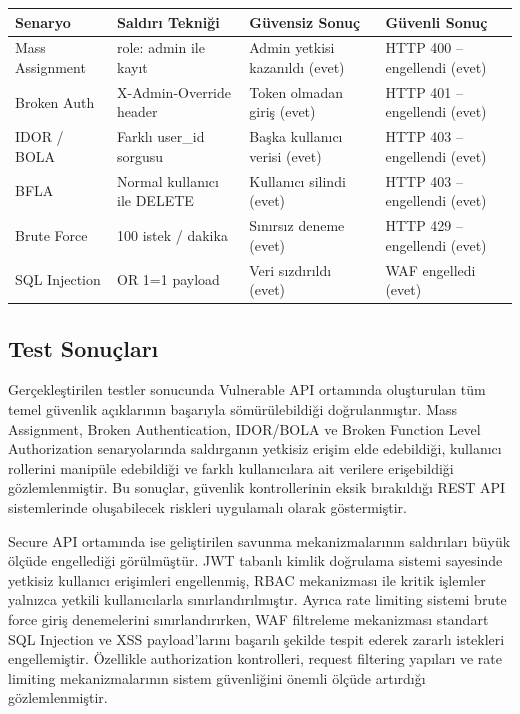 \begin{table}[H]
\centering
\begin{tabular}{|L{3.0cm}|L{3.0cm}|L{3.0cm}|L{3.0cm}|}
\hline
\textbf{Senaryo} & \textbf{Saldırı Tekniği} & \textbf{Güvensiz Sonuç} & \textbf{Güvenli Sonuç} \\
\hline
Mass Assignment & role: admin ile kayıt & Admin yetkisi kazanıldı (evet) & HTTP 400 -- engellendi (evet) \\
\hline
Broken Auth & X-Admin-Override header & Token olmadan giriş (evet) & HTTP 401 -- engellendi (evet) \\
\hline
IDOR / BOLA & Farklı user\_id sorgusu & Başka kullanıcı verisi (evet) & HTTP 403 -- engellendi (evet) \\
\hline
BFLA & Normal kullanıcı ile DELETE & Kullanıcı silindi (evet) & HTTP 403 -- engellendi (evet) \\
\hline
Brute Force & 100 istek / dakika & Sınırsız deneme (evet) & HTTP 429 -- engellendi (evet) \\
\hline
SQL Injection & OR 1=1 payload & Veri sızdırıldı (evet) & WAF engelledi (evet) \\
\hline
\end{tabular}
\end{table}

\subsection{Test Sonuçları}
\label{test-sonu-lar}

Gerçekleştirilen testler sonucunda Vulnerable API ortamında oluşturulan tüm temel güvenlik açıklarının başarıyla sömürülebildiği doğrulanmıştır. Mass Assignment, Broken Authentication, IDOR/BOLA ve Broken Function Level Authorization senaryolarında saldırganın yetkisiz erişim elde edebildiği, kullanıcı rollerini manipüle edebildiği ve farklı kullanıcılara ait verilere erişebildiği gözlemlenmiştir. Bu sonuçlar, güvenlik kontrollerinin eksik bırakıldığı REST API sistemlerinde oluşabilecek riskleri uygulamalı olarak göstermiştir.

Secure API ortamında ise geliştirilen savunma mekanizmalarının saldırıları büyük ölçüde engellediği görülmüştür. JWT tabanlı kimlik doğrulama sistemi sayesinde yetkisiz kullanıcı erişimleri engellenmiş, RBAC mekanizması ile kritik işlemler yalnızca yetkili kullanıcılarla sınırlandırılmıştır. Ayrıca rate limiting sistemi brute force giriş denemelerini sınırlandırırken, WAF filtreleme mekanizması standart SQL Injection ve XSS payload’larını başarılı şekilde tespit ederek zararlı istekleri engellemiştir. Özellikle authorization kontrolleri, request filtering yapıları ve rate limiting mekanizmalarının sistem güvenliğini önemli ölçüde artırdığı gözlemlenmiştir.

